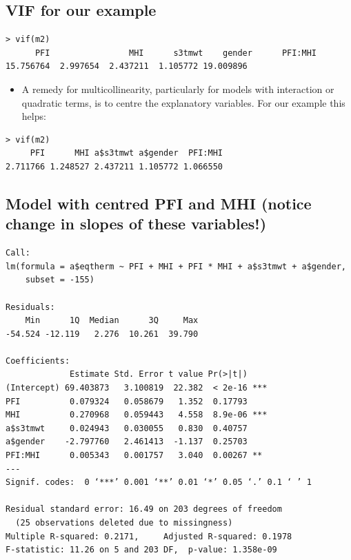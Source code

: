 \documentclass[
]{book}
\providecommand{\tightlist}{%
  \setlength{\itemsep}{0pt}\setlength{\parskip}{0pt}}
\begin{document}
\hypertarget{vif-for-our-example}{%
\subsection{VIF for our example}\label{vif-for-our-example}}

\begin{verbatim}
> vif(m2)
      PFI                MHI      s3tmwt    gender      PFI:MHI 
15.756764  2.997654  2.437211  1.105772 19.009896
\end{verbatim}

\begin{itemize}
\tightlist
\item
  A remedy for multicollinearity, particularly for models with interaction or quadratic terms, is to centre the explanatory variables. For our example this helps:
\end{itemize}

\begin{verbatim}
> vif(m2)
     PFI      MHI a$s3tmwt a$gender  PFI:MHI 
2.711766 1.248527 2.437211 1.105772 1.066550 
\end{verbatim}

\hypertarget{model-with-centred-pfi-and-mhi-notice-change-in-slopes-of-these-variables}{%
\subsection{Model with centred PFI and MHI (notice change in slopes of these variables!)}\label{model-with-centred-pfi-and-mhi-notice-change-in-slopes-of-these-variables}}

\begin{verbatim}
Call:
lm(formula = a$eqtherm ~ PFI + MHI + PFI * MHI + a$s3tmwt + a$gender, 
    subset = -155)

Residuals:
    Min      1Q  Median      3Q     Max 
-54.524 -12.119   2.276  10.261  39.790 

Coefficients:
             Estimate Std. Error t value Pr(>|t|)    
(Intercept) 69.403873   3.100819  22.382  < 2e-16 ***
PFI          0.079324   0.058679   1.352  0.17793    
MHI          0.270968   0.059443   4.558  8.9e-06 ***
a$s3tmwt     0.024943   0.030055   0.830  0.40757    
a$gender    -2.797760   2.461413  -1.137  0.25703    
PFI:MHI      0.005343   0.001757   3.040  0.00267 ** 
---
Signif. codes:  0 ‘***’ 0.001 ‘**’ 0.01 ‘*’ 0.05 ‘.’ 0.1 ‘ ’ 1 

Residual standard error: 16.49 on 203 degrees of freedom
  (25 observations deleted due to missingness)
Multiple R-squared: 0.2171,     Adjusted R-squared: 0.1978 
F-statistic: 11.26 on 5 and 203 DF,  p-value: 1.358e-09 
\end{verbatim}
\end{document}
